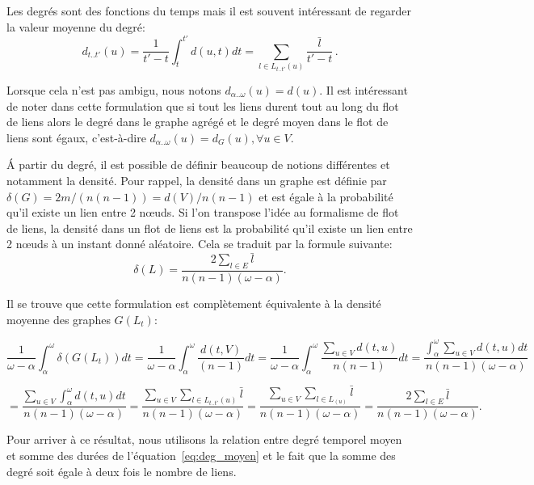 Les degrés sont des fonctions du temps mais il est souvent intéressant de regarder la valeur moyenne du degré:
\begin{equation}
d_{t..t'}(u)=\dfrac{1}{t'-t}  \int_{t}^{t'}d(u,t) dt = \sum_{l \in L_{t..t'}(u)} \dfrac{\bar{l}}{t'-t} \, .
\label{eq:deg_moyen}
\end{equation}

Lorsque cela n'est pas ambigu, nous notons $d_{\alpha..\omega}(u) = d(u)$.
Il est intéressant de noter dans cette formulation que si tout les liens durent tout au long du flot de liens alors le degré dans le graphe agrégé et le degré moyen dans le flot de liens sont égaux, c'est-à-dire  $d_{\alpha..\omega}(u) = d_G(u), \forall u \in V$.

\'A partir du degré, il est possible de définir beaucoup de notions différentes et notamment la densité.
Pour rappel, la densité dans un graphe est définie par $\delta(G)=2m/(n(n-1))=d(V)/n(n-1)$ et est égale à la probabilité qu'il existe un lien entre 2 n\oe uds.
Si l'on transpose l'idée au formalisme de flot de liens, la densité dans un flot de liens est la probabilité qu'il existe un lien entre 2 n\oe uds à un instant donné aléatoire.
Cela se traduit par la formule suivante:
\begin{equation}
\delta(L)= \dfrac{2 \sum_{l \in E}\bar{l}}{n(n-1) (\omega-\alpha)}.
\end{equation}

Il se trouve que cette formulation est complètement équivalente à la densité moyenne des graphes $G(L_t)$:

\begin{equation*}
\dfrac{1}{\omega-\alpha} \int_{\alpha}^{\omega} \delta(G(L_t)) dt=
\dfrac{1}{\omega-\alpha} \int_{\alpha}^{\omega} \dfrac{d(t,V)}{(n-1)}dt=
 \dfrac{1}{\omega-\alpha} \int_{\alpha}^{\omega} \dfrac{\sum_{u \in V} d(t,u)}{n(n-1)}dt = 
 \dfrac{\int_{\alpha}^{\omega} \sum_{u \in V} d(t,u)dt}{n(n-1)(\omega-\alpha)} 
 \end{equation*}

 \begin{equation*}
 =
\dfrac{\sum_{u \in V} \int_{\alpha}^{\omega}d(t,u)dt}{n(n-1)(\omega-\alpha)} =
\dfrac{\sum_{u \in V} \sum_{l \in L_{t..t'}(u)} \bar{l}}{n(n-1)(\omega-\alpha)} =
\dfrac{\sum_{u \in V} \sum_{l \in L_(u)} \bar{l}}{n(n-1)(\omega-\alpha)}=
\dfrac{2\sum_{l \in E}\bar{l}}{n(n-1) (\omega-\alpha)} .
\end{equation*}

Pour arriver à ce résultat, nous utilisons la relation entre degré temporel moyen et somme des durées de l'équation~\ref{eq:deg_moyen} et le fait que la somme des degré soit égale à deux fois le nombre de liens.


